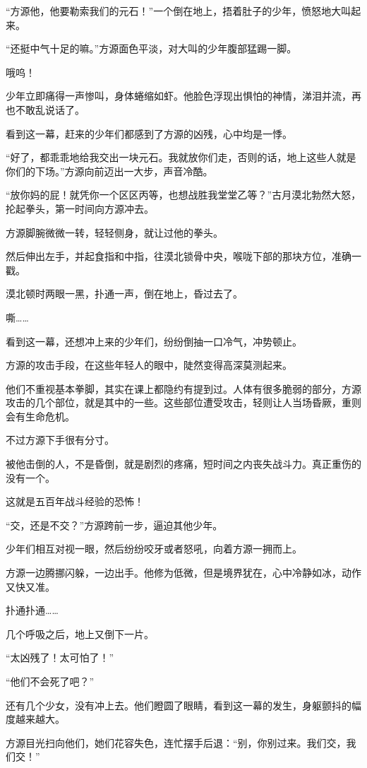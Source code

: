 \begin{this_body}
“方源他，他要勒索我们的元石！”一个倒在地上，捂着肚子的少年，愤怒地大叫起来。

“还挺中气十足的嘛。”方源面色平淡，对大叫的少年腹部猛踢一脚。

哦呜！

少年立即痛得一声惨叫，身体蜷缩如虾。他脸色浮现出惧怕的神情，涕泪并流，再也不敢乱说话了。

看到这一幕，赶来的少年们都感到了方源的凶残，心中均是一悸。

“好了，都乖乖地给我交出一块元石。我就放你们走，否则的话，地上这些人就是你们的下场。”方源向前迈出一大步，声音冷酷。

“放你妈的屁！就凭你一个区区丙等，也想战胜我堂堂乙等？”古月漠北勃然大怒，抡起拳头，第一时间向方源冲去。

方源脚腕微微一转，轻轻侧身，就让过他的拳头。

然后伸出左手，并起食指和中指，往漠北锁骨中央，喉咙下部的那块方位，准确一戳。

漠北顿时两眼一黑，扑通一声，倒在地上，昏过去了。

嘶……

看到这一幕，还想冲上来的少年们，纷纷倒抽一口冷气，冲势顿止。

方源的攻击手段，在这些年轻人的眼中，陡然变得高深莫测起来。

他们不重视基本拳脚，其实在课上都隐约有提到过。人体有很多脆弱的部分，方源攻击的几个部位，就是其中的一些。这些部位遭受攻击，轻则让人当场昏厥，重则会有生命危机。

不过方源下手很有分寸。

被他击倒的人，不是昏倒，就是剧烈的疼痛，短时间之内丧失战斗力。真正重伤的没有一个。

这就是五百年战斗经验的恐怖！

“交，还是不交？”方源跨前一步，逼迫其他少年。

少年们相互对视一眼，然后纷纷咬牙或者怒吼，向着方源一拥而上。

方源一边腾挪闪躲，一边出手。他修为低微，但是境界犹在，心中冷静如冰，动作又快又准。

扑通扑通……

几个呼吸之后，地上又倒下一片。

“太凶残了！太可怕了！”

“他们不会死了吧？”

还有几个少女，没有冲上去。他们瞪圆了眼睛，看到这一幕的发生，身躯颤抖的幅度越来越大。

方源目光扫向他们，她们花容失色，连忙摆手后退：“别，你别过来。我们交，我们交！”


\end{this_body}
